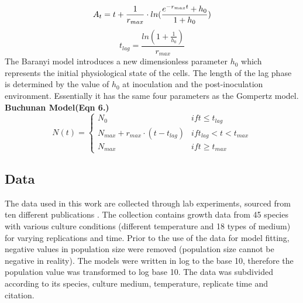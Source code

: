 \documentclass[a4paper,11pt]{article}
\theoremstyle{definition}
\begin{document}
\begin{equation}
    A_t = t + \frac{1}{r_{max}}\cdot ln(\frac{e^{-r_{max}t}+h_0}{1+h_0})\\
\end{equation}
\begin{equation}
    t_{lag} = \frac{ln(1+\frac{1}{h_0})}{r_{max}}
\end{equation}
The Baranyi model introduces a new dimensionless parameter $h_0$ which represents the initial physiological state of the cells. The length of the lag phase is determined by the value of $h_0$ at inoculation and the post-inoculation environment. Essentially it has the same four parameters as the Gompertz model.\\
\textbf{Buchunan Model(Eqn 6.)}
\begin{equation}
    N(t)=\left\{\begin{matrix}
N_0 & if  t\leq t_{lag} \\ N_{max} + r_{max}\cdot (t-t_{lag})
 & if t_{lag} < t < t_{max} \\N_{max}
 & if t\geq t_{max} 
\end{matrix}\right.
\end{equation}

\subsection{Data}
The data used in this work are collected through lab experiments, sourced from ten different publications \citep{bae2014growth,bernhardt2018metabolic,galarz2016predicting,gill1991growth,phillips1987relation,roth1962continuity,silva2018modelling,sivonen1990effects, stannard1985temperature,zwietering1994modeling}. The collection contains growth data from 45 species with various culture conditions (different temperature and 18 types of medium) for varying replications and time. Prior to the use of the data for model fitting, negative values in population size were removed (population size cannot be negative in reality). The models were written in log to the base 10, therefore the population value was transformed to log base 10. The data was subdivided according to its species, culture medium, temperature, replicate time and citation.
\end{document}
